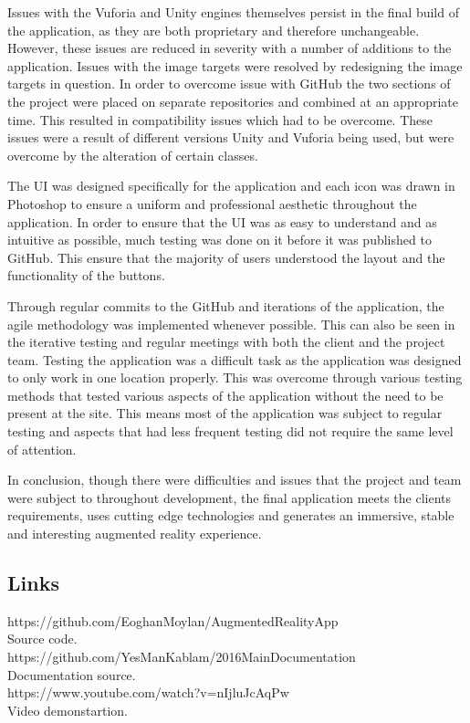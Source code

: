 Issues with the Vuforia and Unity engines themselves persist in the final build of the application, as they are both proprietary and therefore unchangeable. However, these issues are reduced in severity with a number of additions to the application. Issues with the image targets were resolved by redesigning the image targets in question. In order to overcome issue with GitHub the two sections of the project were placed on separate repositories and combined at an appropriate time. This resulted in compatibility issues which had to be overcome. These issues were a result of different versions Unity and Vuforia being used, but were overcome by the alteration of certain classes.

The UI was designed specifically for the application and each icon was drawn in Photoshop to ensure a uniform and professional aesthetic throughout the application. In order to ensure that the UI was as easy to understand and as intuitive as possible, much testing was done on it before it was published to GitHub. This ensure that the majority of users understood the layout and the functionality of the buttons.

Through regular commits to the GitHub and iterations of the application, the agile methodology was implemented whenever possible. This can also be seen in the iterative testing and regular meetings with both the client and the project team. Testing the application was a difficult task as the application was designed to only work in one location properly. This was overcome through various testing methods that tested various aspects of the application without the need to be present at the site. This means most of the application was subject to regular testing and aspects that had less frequent testing did not require the same level of attention.

In conclusion, though there were difficulties and issues that the project and team were subject to throughout development, the final application meets the clients requirements, uses cutting edge technologies and generates an immersive, stable and interesting augmented reality experience.

\begin{appendices}
\chapter{Links}
https://github.com/EoghanMoylan/AugmentedRealityApp \\
Source code.\\

https://github.com/YesManKablam/2016MainDocumentation \\
Documentation source.\\

https://www.youtube.com/watch?v=nIjluJcAqPw\\
Video demonstartion.\\
\end{appendices}